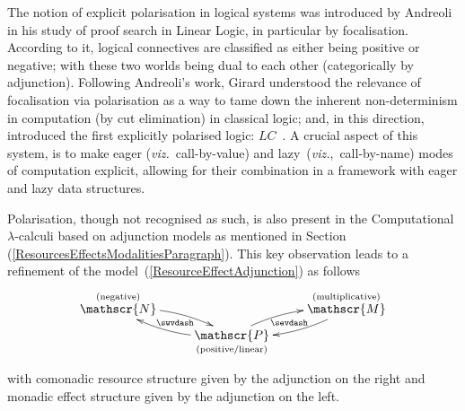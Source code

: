 \documentclass[11pt,twocolumn]{article}
\newcommand{\pref}[1]{\,(\ref{#1})}
\newcommand{\viz}{\emph{viz.}}
\newcommand{\LC}{\mbox{$LC$}}
\newcommand{\cat}[1]{\mathscr{#1}}
\begin{document}
The notion of explicit polarisation in logical systems was introduced by
Andreoli~\cite{Andreoli} in his study of proof search in Linear Logic, in
particular by focalisation.  According to it, logical connectives are
classified as either being positive or negative; with these two worlds
being dual to each other (categorically by adjunction).  Following
Andreoli's work, Girard understood the relevance of focalisation via
polarisation as a way to tame down the inherent non-determinism in
computation (by cut elimination) in classical logic; and, in this
direction, introduced the first explicitly polarised logic:
\LC~\cite{GirardLC}.  A crucial aspect of this system, is to make eager
(\viz~call-by-value) and lazy~(\viz,~call-by-name) modes of computation
explicit, allowing for their combination in a framework with eager and
lazy data structures.

Polarisation, though not recognised as such, is also present in the
Computational \mbox{$\lambda$-calculi} based on adjunction models as mentioned
in Section\pref{ResourcesEffectsModalitiesParagraph}.  This key
observation leads to a refinement of the
model~(\ref{ResourceEffectAdjunction}) as follows
\begin{equation}\label{LCBPV}
  \begin{minipage}{\columnwidth}
  \xymatrix@R=5pt{
    & & 
    \\
    \ar@{}[u]|-{\text{\scriptsize(negative)}}
    \cat N \ar@/^.75em/[dr] & \ar@{}[rd]|-{\sevdash} \ar@{}[dl]|-{\swvdash} &
    \ar@/^.75em/[dl] \cat M \ar@{}[u]|-{\text{\scriptsize(multiplicative)}}\\
    & \ar@/^.75em/[lu] \cat P \ar@/^.75em/[ur]
    \ar@{}[d]|-{\txt{\scriptsize(positive/linear)}}& 
    \\ & & 
  }
\end{minipage}
\end{equation}
with comonadic resource structure given by the adjunction on the right and
monadic effect structure given by the adjunction on the left.
\end{document}
